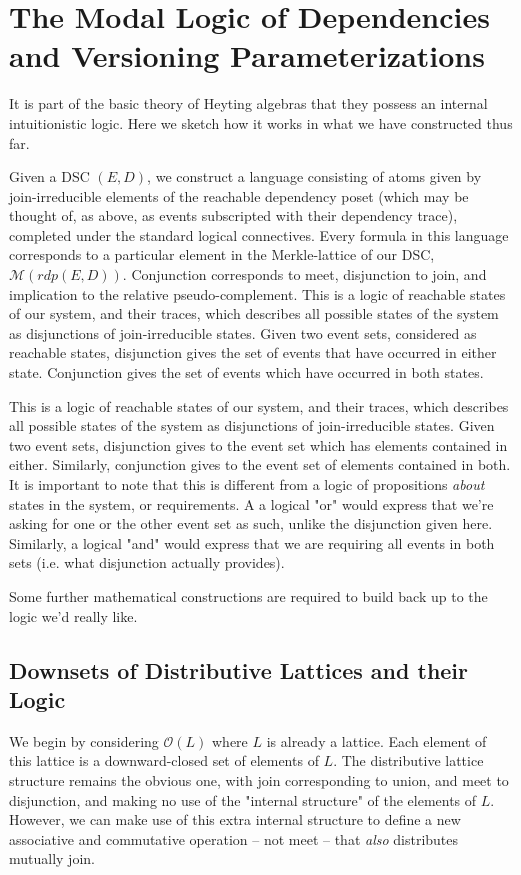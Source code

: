 \documentclass[hoptionsi,review,format=sigplan]{acmart}
\theoremstyle{definition}
\newcommand{\Mcc}{\mathcal{M}}
\newcommand{\Oc}{\mathcal{O}}
\begin{document}
\section{The Modal Logic of Dependencies and Versioning Parameterizations}
It is part of the basic theory of Heyting algebras that they possess an internal intuitionistic logic. Here we sketch how it works in what we have constructed thus far.

Given a DSC \((E,D)\), we construct a language consisting of atoms given by join-irreducible elements of the reachable dependency poset (which may be thought of, as above, as events subscripted with their dependency trace), completed under the standard logical connectives. Every formula in this language corresponds to a particular element in the Merkle-lattice of our DSC, \(\Mcc(rdp(E,D))\).  Conjunction corresponds to meet, disjunction to join, and implication to the relative pseudo-complement. This is a logic of reachable states of our system, and their traces, which describes all possible states of the system as disjunctions of join-irreducible states. Given two event sets, considered as reachable states, disjunction gives the set of events that have occurred in either state. Conjunction gives the set of events which have occurred in both states.

This is a logic of reachable states of our system, and their traces, which describes all possible states of the system as disjunctions of join-irreducible states. Given two event sets, disjunction gives to the event set which has elements contained in either. Similarly, conjunction gives to the event set of elements contained in both.  It is important to note that this is different from a logic of propositions \textit{about} states in the system, or requirements. A a logical "or"  would express that we're asking for one or the other event set as such, unlike the disjunction given here. Similarly, a logical "and" would express that we are requiring all events in both sets (i.e. what disjunction actually provides).

Some further mathematical constructions are required to build back up to the logic we'd really like.

\subsection{Downsets of Distributive Lattices and their Logic}

We begin by considering \(\Oc(L)\) where \(L\) is already a lattice. Each element of this lattice is a downward-closed set of elements of \(L\). The distributive lattice structure remains the obvious one, with join corresponding to union, and meet to disjunction, and making no use of the "internal structure" of the elements of \(L\). However, we can make use of this extra internal structure to define a new associative and commutative operation -- not meet -- that \textit{also} distributes mutually join.
\end{document}

